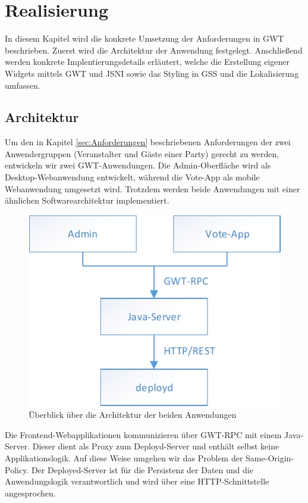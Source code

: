 \section{Realisierung}

In diesem Kapitel wird die konkrete Umsetzung der Anforderungen in GWT beschrieben.
Zuerst wird die Architektur der Anwendung festgelegt. Anschließend werden konkrete
Implentierungsdetails erläutert, welche die Erstellung eigener Widgets mittels GWT und
JSNI sowie das Styling in GSS und die Lokalisierung umfassen.

\subsection{Architektur}
Um den in Kapitel \ref{sec:Anforderungen} beschriebenen Anforderungen der zwei Anwendergruppen (Veranstalter und Gäste einer Party) gerecht zu werden, entwickeln wir zwei GWT-Anwendungen. Die Admin-Oberfläche wird als Desktop-Webanwendung
entwickelt, während die Vote-App als mobile Webanwendung umgesetzt wird. Trotzdem werden beide Anwendungen mit einer ähnlichen Softwarearchitektur implementiert.

\begin{figure}[tbh]
\centering
\includegraphics[width=0.7\linewidth]{Bilder/Architektur-Ueberblick}
\caption{Überblick über die Architektur der beiden Anwendungen}
\label{fig:Architektur-Ueberblick}
\end{figure}

Die Frontend-Webapplikationen kommunizieren über GWT-RPC mit einem Java-Server. Dieser dient als 
Proxy zum Deployd-Server und enthält selbst keine Applikationslogik. Auf diese Weise umgehen wir das Problem der Same-Origin-Policy. Der Deployed-Server ist für die Persistenz der Daten und die Anwendungslogik verantwortlich und wird über eine HTTP-Schnittstelle angesprochen.


